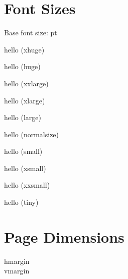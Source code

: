 \documentclass[10pt]{kharticle}
\begin{document}
\section{Font Sizes}
Base font size: \makeatletter\f@size\makeatother pt

\begingroup
\setlength{\parindent}{0em}
\Huge hello (xhuge)\par
\huge hello (huge)\par
\LARGE hello (xxlarge)\par
\Large hello (xlarge)\par
\large hello (large)\par
\normalsize hello (normalsize)\par
\small hello (small)\par
\footnotesize hello (xsmall)\par
\scriptsize hello (xxsmall)\par
\tiny hello (tiny)\par
\endgroup

\section{Page Dimensions}

hmargin  \\
vmargin 
\end{document}
